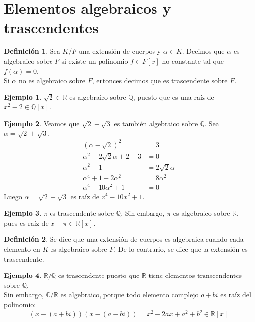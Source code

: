 \documentclass{report}
\theoremstyle{remark}
\theoremstyle{definition}
\newtheorem{definition}{Definición}[chapter]
\theoremstyle{definition}
\theoremstyle{definition}
\newtheorem*{example}{Ejemplo}
\begin{document}
\section{Elementos algebraicos y trascendentes}

\begin{definition}
    Sea $K/F$ una extensión de cuerpos y $\alpha \in K$. Decimos que $\alpha$ es algebraico sobre $F$ si existe un polinomio $f \in F[x]$ no constante tal que $f(\alpha) = 0$.\\
    Si $\alpha$ no es algebraico sobre $F$, entonces decimos que es trascendente sobre $F$.
\end{definition}

\begin{example}
    $\sqrt{2} \in \mathbb{R}$ es algebraico sobre $\mathbb{Q}$, puesto que es una raíz de $x^2 - 2 \in \mathbb{Q}[x]$.
\end{example}

\begin{example}
    Veamos que $\sqrt{2} + \sqrt{3}$ es también algebraico sobre $\mathbb{Q}$. Sea $\alpha = \sqrt{2} + \sqrt{3}$.
    \begin{align*}
        (\alpha - \sqrt{2})^2              & = 3               \\
        \alpha^2 - 2\sqrt{2}\alpha + 2 - 3 & = 0               \\
        \alpha^2 - 1                       & = 2\sqrt{2}\alpha \\
        \alpha^4 + 1 - 2\alpha^2           & = 8\alpha^2       \\
        \alpha^4 - 10\alpha^2 + 1          & = 0
    \end{align*}
    Luego $\alpha = \sqrt{2} + \sqrt{3}$ es raíz de $x^4 - 10x^2 + 1$.
\end{example}

\begin{example}
    $\pi$ es trascendente sobre $\mathbb{Q}$. Sin embargo, $\pi$ es algebraico sobre $\mathbb{R}$, pues es raíz de $x - \pi \in \mathbb{R}[x]$.
\end{example}

\begin{definition}
    Se dice que una extensión de cuerpos es algebraica cuando cada elemento en $K$ es algebraico sobre $F$.
    De lo contrario, se dice que la extensión es trascendente.
\end{definition}

\begin{example}
    $\mathbb{R}/\mathbb{Q}$ es trascendente puesto que $\mathbb{R}$ tiene elementos transcendentes sobre $\mathbb{Q}$.\\
    Sin embargo, $\mathbb{C}/\mathbb{R}$ es algebraico, porque todo elemento complejo $a + bi$ es raíz del polinomio:
    $$(x - (a+bi))(x - (a-bi)) = x^2 - 2ax + a^2 + b^2 \in \mathbb{R}[x]$$
\end{example}
\end{document}
